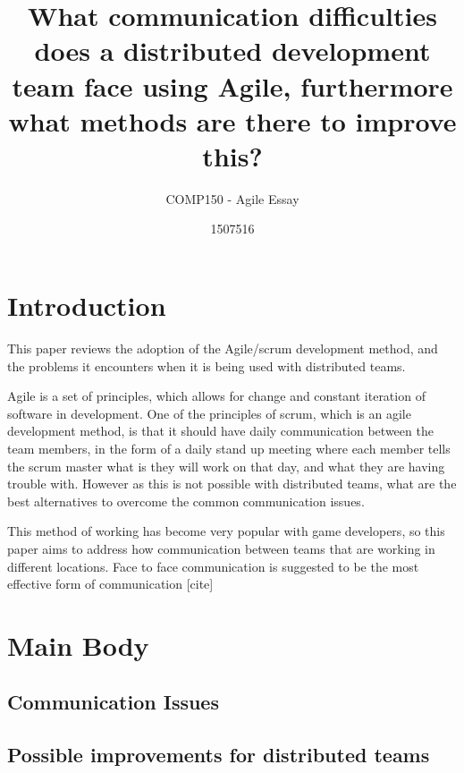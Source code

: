 \documentclass{scrartcl}
\title{What communication difficulties does a distributed development team face using Agile, furthermore what methods are there to improve this?
}
\subtitle{COMP150 - Agile Essay}
\author{1507516}
\begin{document}
\maketitle


\section{Introduction}

This paper reviews the adoption of the Agile/scrum development method, and the problems it encounters when it is being used with distributed teams.

Agile is a set of principles, which allows for change and constant iteration of software in development. One of the principles of scrum, which is an agile development method, is that it should have daily communication between the team members\cite{abdullah2011}, in the form of a daily stand up meeting where each member tells the scrum master what is they will work on that day, and what they are having trouble with. However as this is not possible with distributed teams, what are the best alternatives to overcome the common communication issues.

This method of working has become very popular with game developers, so this paper aims to address how communication between teams that are working in different locations. Face to face communication is suggested to be the most effective form of communication [cite]


\section{Main Body}

\subsection{Communication Issues}




\subsection{Possible improvements for distributed teams}
\end{document}
